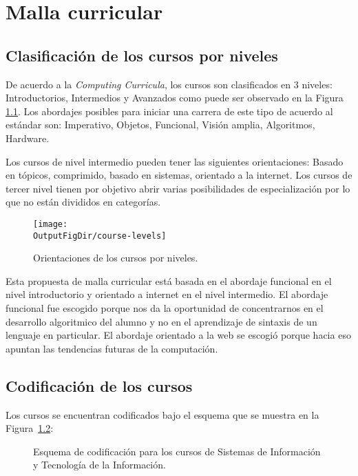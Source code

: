 \chapter{Malla curricular}\label{chap:GeneralInfo}

\section{Clasificación de los cursos por niveles}
De acuerdo a la \textit{Computing Curricula}, los cursos son clasificados en 3 niveles: 
Introductorios, Intermedios y Avanzados como puede ser observado en la Figura \ref{fig:niveles}. 
Los abordajes posibles para iniciar una carrera de este tipo de acuerdo al estándar son: 
Imperativo, Objetos, Funcional, Visión amplia, Algoritmos, Hardware.
 
Los cursos de nivel intermedio pueden tener las siguientes orientaciones: 
Basado en tópicos, comprimido, basado en sistemas, orientado a la internet. 
Los cursos de tercer nivel tienen por objetivo abrir varias posibilidades de 
especialización por lo que no están divididos en categorías.

\begin{figure}[ht]
   \centering
   \texttt{[image: \\OutputFigDir/course-levels]}
   \caption{Orientaciones de los cursos por niveles.}
   \label{fig:niveles}
\end{figure}

Esta propuesta de malla curricular está basada en el abordaje funcional en el nivel introductorio y orientado 
a internet en el nivel intermedio. El abordaje funcional fue escogido porque nos da la oportunidad de 
concentrarnos en el desarrollo algoritmico del alumno y no en el aprendizaje de sintaxis de un lenguaje 
en particular. El abordaje orientado a la web se escogió porque hacia eso apuntan las 
tendencias futuras de la computación.

\section{Codificación de los cursos}
Los cursos se encuentran codificados bajo el esquema que se muestra en la Figura~\ref{fig:course-number}:
\begin{figure}[ht]
   \centering
   \caption{Esquema de codificación para los cursos de Sistemas de Información y Tecnología de la Información.}
   \label{fig:course-number}
\end{figure}

